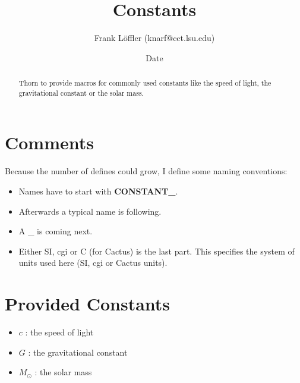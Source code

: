 \documentclass{article}
\begin{document}
\title{Constants}
\author{Frank L\"offler (knarf@cct.lsu.edu)}
\date{$ $Date$ $}

\maketitle


\begin{abstract}
Thorn to provide macros for commonly used constants like the speed of light,
the gravitational constant or the solar mass.
\end{abstract}

\section{Comments}
 Because the number of defines could grow, I define some naming conventions:
 \begin{itemize}
  \item Names have to start with \textbf{CONSTANT\_}.
  \item Afterwards a typical name is following.
  \item A \_ is coming next.
  \item Either SI, cgi or C (for Cactus) is the last part. This specifies the
        system of units used here (SI, cgi or Cactus units).
 \end{itemize}
\section{Provided Constants}
 \begin{itemize}
  \item $c$ : the speed of light
  \item $G$ : the gravitational constant
  \item $M_{\odot}$ : the solar mass
 \end{itemize}
 
\end{document}
